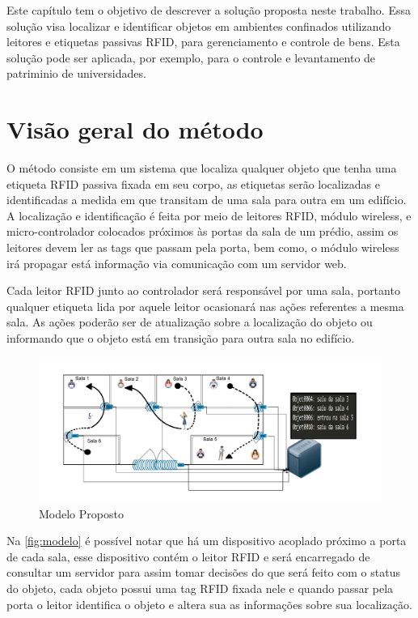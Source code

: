 \label{chapter:metodo}

Este capítulo tem o objetivo de descrever a solução proposta neste trabalho. Essa solução visa localizar e identificar objetos
em ambientes confinados utilizando leitores e etiquetas passivas RFID, para gerenciamento e controle de bens.
%
Esta solução pode ser aplicada, por exemplo, para o controle e levantamento de patriminio de universidades.

%
%
\section{Visão geral do método}

O método consiste em um sistema que localiza qualquer objeto que tenha uma etiqueta RFID passiva fixada em seu corpo,
as etiquetas serão localizadas e identificadas a medida em que transitam de uma sala para outra em um edifício.
%
A localização e identificação é feita por meio de leitores RFID, módulo wireless, e micro-controlador colocados próximos às portas da sala
de um prédio, assim os leitores devem ler as tags que passam pela porta, bem como, o módulo wireless irá propagar está informação via
comunicação com um servidor web.


Cada leitor RFID junto ao controlador será responsável por uma sala, portanto qualquer etiqueta lida por aquele leitor
ocasionará nas ações referentes a mesma sala. As ações poderão ser de atualização sobre a localização do objeto ou informando
que o objeto está em transição para outra sala no edifício.
\begin{figure}[H]
              \caption{\label{fig:modelo}{Modelo Proposto}}
              \centering
              \includegraphics[width=1.1\textwidth]{Figuras/bigpicture.png}
        \end{figure}

\par
Na \autoref{fig:modelo} é possível notar que há um dispositivo acoplado próximo a
porta de cada sala, esse dispositivo contém o leitor RFID e será encarregado de consultar um
servidor para assim tomar decisões do que será feito com o status do objeto, cada objeto possui uma tag RFID fixada
nele e quando passar pela porta o leitor identifica o objeto e altera sua as informações sobre sua localização.

